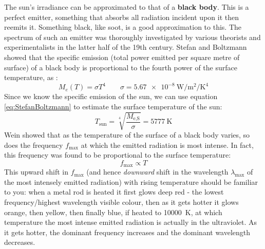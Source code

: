 \documentclass[class=scrartcl, crop=false,parskip=half,]{standalone}
\begin{document}
The sun's irradiance can be approximated to that of a \textbf{black body}. This is a perfect emitter, something that absorbs all radiation incident upon it then reemits it. Something black, like soot, is a good approximation to this. The spectrum of such an emitter was thoroughly investigated by various theorists and experimentalists in the latter half of the 19th century. Stefan and Boltzmann showed that the specific emission (total power emitted per square metre of surface) of a black body is proportional to the fourth power of the surface temperature, as :
\begin{equation}\label{eq:StefanBoltzmann}
    M_e(T)=\sigma T^4 \qquad \sigma=\SI{5.67e-8}{\watt\per\metre\squared\per\kelvin\tothe{4}}
\end{equation}
Since we know the specific emission of the sun, we can use equation \eqref{eq:StefanBoltzmann} to estimate the surface temperature of the sun:
\begin{equation}
    T_{\text{sun}}=\sqrt[4]{\frac{M_{\text{e,S}}}{\sigma}}=\SI{5777}{\kelvin}
\label{eq:Tsun}
\end{equation}
Wein showed that as the temperature of the surface of a black body varies, so does the frequency $f_\text{max}$ at which the emitted radiation is most intense. In fact, this frequency was found to be proportional to the surface temperature:
\begin{equation} \label{eq:WeinDisplacement}
f_\text{max}\propto T
\end{equation}
This upward shift in $f_\text{max}$ (and hence \emph{downward} shift in the wavelength $\lambda_\text{max}$ of the most intensely emitted radiation) with rising temperature should be familiar to you: when a metal rod is heated it first glows deep red - the lowest frequency/highest wavelength visible colour, then as it gets hotter it glows orange, then yellow, then finally blue, if heated to \SI{10000}{K}, at which temperature the most intense emitted radiation is actually in the ultraviolet. As it gets hotter, the dominant frequency increases and the dominant wavelength decreases.
\end{document}
